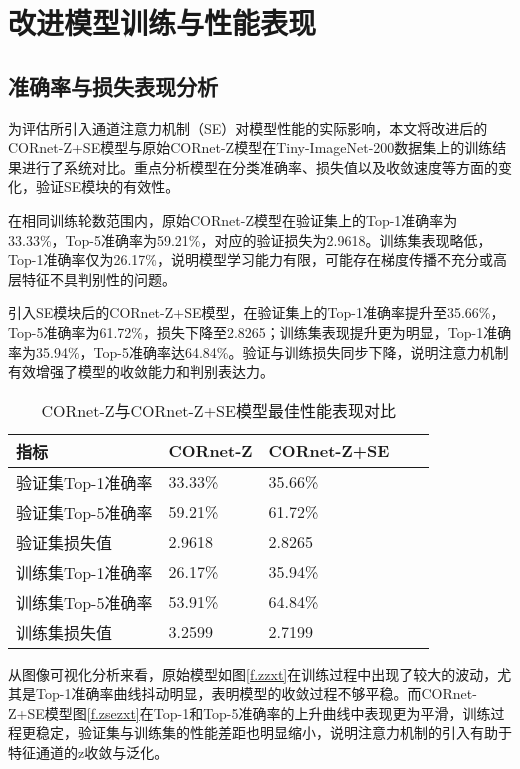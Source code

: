 \section{改进模型训练与性能表现}

\subsection{准确率与损失表现分析}

为评估所引入通道注意力机制（SE）对模型性能的实际影响，本文将改进后的CORnet-Z+SE模型与原始CORnet-Z模型在Tiny-ImageNet-200数据集上的训练结果进行了系统对比。重点分析模型在分类准确率、损失值以及收敛速度等方面的变化，验证SE模块的有效性。

在相同训练轮数范围内，原始CORnet-Z模型在验证集上的Top-1准确率为33.33\%，Top-5准确率为59.21\%，对应的验证损失为2.9618。训练集表现略低，Top-1准确率仅为26.17\%，说明模型学习能力有限，可能存在梯度传播不充分或高层特征不具判别性的问题。

引入SE模块后的CORnet-Z+SE模型，在验证集上的Top-1准确率提升至35.66\%，Top-5准确率为61.72\%，损失下降至2.8265；训练集表现提升更为明显，Top-1准确率为35.94\%，Top-5准确率达64.84\%。验证与训练损失同步下降，说明注意力机制有效增强了模型的收敛能力和判别表达力。

\begin{table}[htb]
	\centering
	\caption{CORnet-Z与CORnet-Z+SE模型最佳性能表现对比}
	\label{tab:CORnet-Z与CORnet-Z+SE模型最佳性能表现对比}
	\begin{tabular}{lllll}
		\hline
		指标& CORnet-Z & CORnet-Z+SE \\
		\hline
		验证集Top-1准确率 & 33.33\% & 35.66\%  \\
		验证集Top-5准确率 & 59.21\% & 61.72\%  \\
		验证集损失值 & 2.9618 & 2.8265  \\
		训练集Top-1准确率 & 26.17\% & 35.94\%  \\
		训练集Top-5准确率 & 53.91\% & 64.84\%  \\
		训练集损失值 & 3.2599 & 2.7199  \\
		\hline
	\end{tabular}
\end{table}

从图像可视化分析来看，原始模型如图\ref{f.zzxt}在训练过程中出现了较大的波动，尤其是Top-1准确率曲线抖动明显，表明模型的收敛过程不够平稳。而CORnet-Z+SE模型图\ref{f.zsezxt}在Top-1和Top-5准确率的上升曲线中表现更为平滑，训练过程更稳定，验证集与训练集的性能差距也明显缩小，说明注意力机制的引入有助于特征通道的z收敛与泛化。

